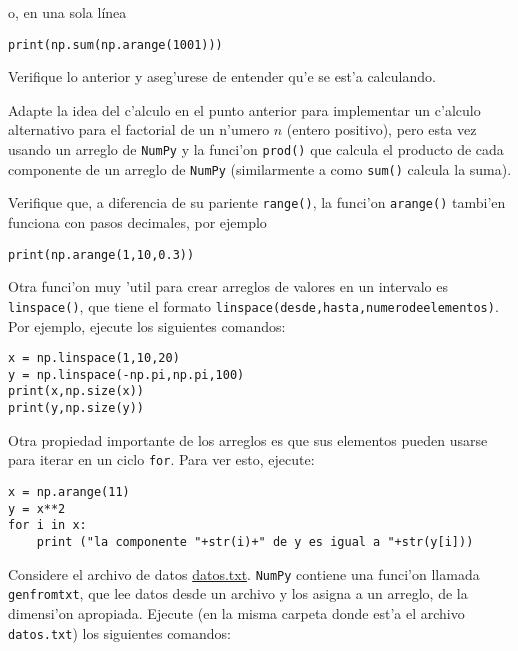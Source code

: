 \documentclass[11pt]{exam}
\begin{document}
\begin{questions}
o, en una sola línea

\begin{verbatim}
print(np.sum(np.arange(1001)))
\end{verbatim}

Verifique lo anterior y aseg'urese de entender qu'e se est'a calculando.

\item Adapte la idea del c'alculo en el punto anterior para implementar un c'alculo alternativo para el factorial de un n'umero $n$ (entero positivo), pero esta vez usando un arreglo de \texttt{NumPy} y la funci'on \texttt{prod()} que calcula el producto de cada componente de un arreglo de \texttt{NumPy} (similarmente a como \texttt{sum()} calcula la suma).

\item Verifique que, a diferencia de su pariente \texttt{range()}, la funci'on \texttt{arange()} tambi'en funciona con pasos decimales, por ejemplo

\begin{verbatim}
print(np.arange(1,10,0.3))
\end{verbatim}

\item Otra funci'on muy 'util para crear arreglos de valores en un intervalo es \texttt{linspace()}, que tiene el formato \texttt{linspace(desde,hasta,numerodeelementos)}. Por ejemplo, ejecute los siguientes comandos:

\begin{verbatim}
x = np.linspace(1,10,20)
y = np.linspace(-np.pi,np.pi,100)
print(x,np.size(x))
print(y,np.size(y))
\end{verbatim}

\item Otra propiedad importante de los arreglos es que sus elementos pueden usarse para iterar en un ciclo \texttt{for}. Para ver esto, ejecute:

\begin{verbatim}
x = np.arange(11)
y = x**2
for i in x:
	print ("la componente "+str(i)+" de y es igual a "+str(y[i]))
\end{verbatim}

\item Considere el archivo de datos \href{https://raw.githubusercontent.com/gfrubi/CC/master/guias/11/datos.txt}{datos.txt}. \texttt{NumPy} contiene una funci'on llamada \texttt{genfromtxt}, que lee datos desde un archivo y los asigna a un arreglo, de la dimensi'on apropiada. Ejecute (en la misma carpeta donde est'a el archivo \texttt{datos.txt}) los siguientes comandos:


\end{questions}
\end{document}
